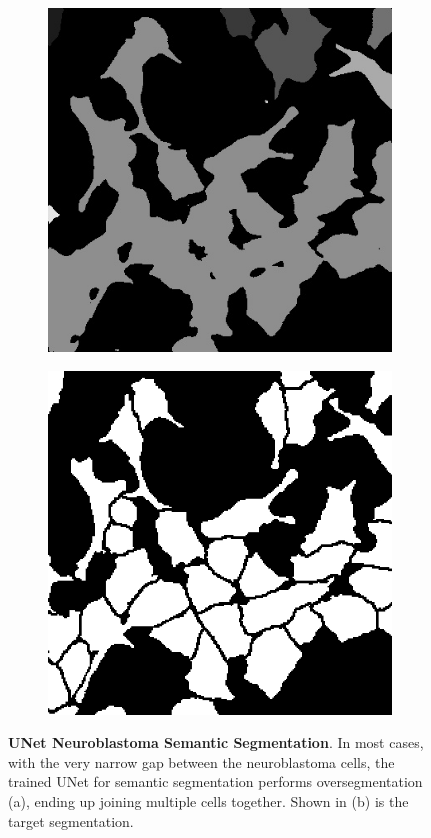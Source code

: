 \documentclass[10pt, journal, compsoc]{IEEEtran}
\begin{document}
\begin{figure}
\centering
\begin{subfigure}[b]{0.45\linewidth}
\includegraphics[width=\linewidth]{unet/110115-instance.jpg}
\caption{}
\end{subfigure}
\begin{subfigure}[b]{0.45\linewidth}
\includegraphics[width=\linewidth]{unet/110115.jpg}
\caption{}
\end{subfigure}
\caption{\textbf{UNet Neuroblastoma Semantic Segmentation}. In most cases, with the very narrow gap between the neuroblastoma cells, the trained UNet for semantic segmentation performs oversegmentation (a), ending up joining multiple cells together. Shown in (b) is the target segmentation.}
\label{fig:unet_results}
\end{figure}
\end{document}
